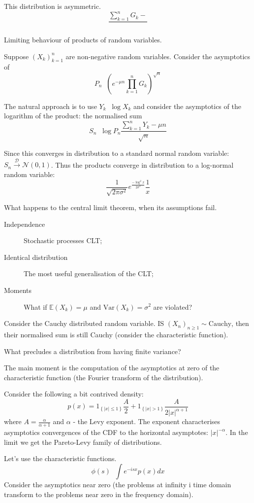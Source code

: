 \documentclass[a4paper]{article}
\newcommand{\obj}[1]{{\left\{ #1 \right \}}}
\newcommand{\brac}[1]{{\left ( #1 \right )}}
\newcommand{\abs}[1]{{\left | #1 \right |}}
\newcommand{\Ex}{\mathbb{E}}
\newcommand{\defn}{\mathop{\overset{\Delta}{=}}\nolimits}
\begin{document}
This distribution is asymmetric.
\[\frac{\sum_{k=1}^n G_k- }{}\]

Limiting behaviour of products of random variables.

Suppose $\brac{X_k}_{k=1}^n$ are non-negative random variables. Consider the asymptotics of \[P_n \defn \brac{e^{-\mu n}\prod_{k=1}^n G_k}^{\sqrt{n}}\]

The natural approach is to use $Y_k\defn \log X_k$ and consider the asymptotics of the logarithm of the product: the normalised sum
\[S_n \defn \log P_n \frac{\sum_{k=1}^n Y_k - \mu n}{\sqrt{n}}\]

Since this converges in distribution to a standard normal random variable: $S_n \overset{\mathcal{D}}{\to} \mathcal{N}(0,1)$. Thus the products converge in distribution to a log-normal random variable:
\[\frac{1}{\sqrt{2\pi\sigma^2}} e^\frac{-\log^2 x}{2\sigma^2}\frac{1}{x}\]

What happens to the central limit theorem, when its assumptions fail.
\begin{description}
	\item[Independence] Stochastic processes CLT;
	\item[Identical distribution] The most useful generalisation of the CLT;
	\item[Moments] What if $\Ex(X_k) = \mu$ and $\text{Var}(X_k) = \sigma^2$ are violated?
\end{description}

Consider the Cauchy distributed random variable. IS $\brac{X_n}_{n\geq1}\sim \text{Cauchy}$, then their normalised sum is still Cauchy (consider the characteristic function).

What precludes a distribution from having finite variance?

The main moment is the computation of the asymptotics at zero of the characteristic function (the Fourier transform of the distribution).

Consider the following a bit contrived density:
\[p(x) = 1_\obj{\abs{x}\leq 1}\frac{A}{2} + 1_\obj{\abs{x}>1}\frac{A}{2\abs{x}^{\alpha+1}}\]
where $A=\frac{\alpha}{\alpha+1}$ and $\alpha$ - the Levy exponent. The exponent characterises asymptotics convergences of the CDF to the horizontal asymptotes: $\abs{x}^{-\alpha}$. In the limit we get the Pareto-Levy family of distributions.

Let's use the characteristic functions.
\[\phi(s)\defn\int e^{-isx}p(x)dx\]
Consider the asymptotics near zero (the problems at infinity i time domain transform to the problems near zero in the frequency domain).
\end{document}
